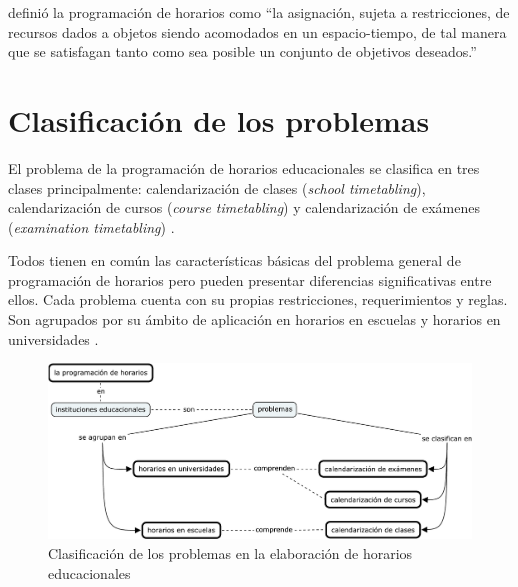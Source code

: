 \documentclass[draft,12pt,headsepline,footsepline,paper=letter]{scrreprt}
\begin{document}
\citet[p.~53]{wren95scheduling-timetabling} definió la programación de horarios como “la asignación, sujeta a restricciones, de recursos dados a objetos siendo acomodados en un espacio-tiempo, de tal manera que se satisfagan tanto como sea posible un conjunto de objetivos deseados.”

\section{Clasificación de los problemas}
\label{sec:clasificacion_problemas}

El problema de la programación de horarios educacionales se clasifica en tres clases principalmente:
calendarización de clases (\textit{school timetabling}),
calendarización de cursos (\textit{course timetabling}) y
calendarización de exámenes (\textit{examination timetabling}) \citep[p.~88]{schaerf99a-survey-of-automated}.

Todos tienen en común las características básicas del problema general de programación de horarios pero pueden presentar diferencias significativas entre ellos. Cada problema cuenta con su propias restricciones, requerimientos y reglas. Son agrupados por su ámbito de aplicación en horarios en escuelas y horarios en universidades \citep[p.~10]{abdullah06heuristic-approaches}.

\begin{figure}[hbtp]
\centering
\includegraphics[width=\textwidth]{timetabling_classification.pdf}
\caption[Clasificación del problema]{Clasificación de los problemas en la elaboración de horarios educacionales}
\label{fig:timetabling_classification}
\end{figure}
\end{document}
